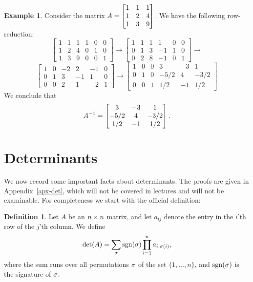 \documentclass[reqno]{amsart}
\theoremstyle{definition}
\newtheorem{definition}[theorem]{Definition}
\newtheorem{example}[theorem]{Example}
\begin{document}
\begin{example}\label{eg-inverse-ii}
 Consider the matrix $A=\left[\begin{matrix} 1&1&1\\1&2&4\\1&3&9\end{matrix}\right]$.  We have the
 following row-reduction:
 \[
  \left[\begin{array}{ccc|ccc}
   1 & 1 & 1 & 1 & 0 & 0 \\
   1 & 2 & 4 & 0 & 1 & 0 \\
   1 & 3 & 9 & 0 & 0 & 1
  \end{array}\right]
  \to
  \left[\begin{array}{ccc|ccc}
   1 & 1 & 1 & 1 & 0 & 0 \\
   0 & 1 & 3 &-1 & 1 & 0 \\
   0 & 2 & 8 &-1 & 0 & 1
  \end{array}\right]
  \to
 \] \[
  \left[\begin{array}{ccc|ccc}
   1 & 0 &-2 & 2 &-1 & 0 \\
   0 & 1 & 3 &-1 & 1 & 0 \\
   0 & 0 & 2 & 1 &-2 & 1
  \end{array}\right]
  \to
  \left[\begin{array}{ccc|ccc}
   1 & 0 & 0 & 3 &-3 & 1 \\
   0 & 1 & 0 &-5/2 & 4 & -3/2 \\
   0 & 0 & 1 & 1/2 &-1 & 1/2
  \end{array}\right]
 \]
 We conclude that
 \[ A^{-1} =
     \left[\begin{matrix}
       3   & -3 & 1 \\
      -5/2 &  4 & -3/2 \\
       1/2 & -1 &  1/2
     \end{matrix}\right].
 \]
\end{example}

\section{Determinants}
\label{sec-det}

We now record some important facts about determinants.  The proofs are
given in Appendix~\ref{apx-det}, which will not be covered in lectures
and will not be examinable.  For completeness we start with the
official definition:

\begin{definition}\label{defn-det-pre}
 Let $A$ be an $n\times n$ matrix, and let $a_{ij}$ denote the entry in
 the $i$'th row of the $j$'th column.  We define
 \[ \det(A) =
     \sum_\sigma \operatorname{sgn}(\sigma) \prod_{i=1}^n a_{i,\sigma(i)},
 \]
 where the sum runs over all permutations $\sigma$ of the set
 $\{1,\dotsc,n\}$, and $\operatorname{sgn}(\sigma)$ is the signature of $\sigma$.
\end{definition}
\end{document}
